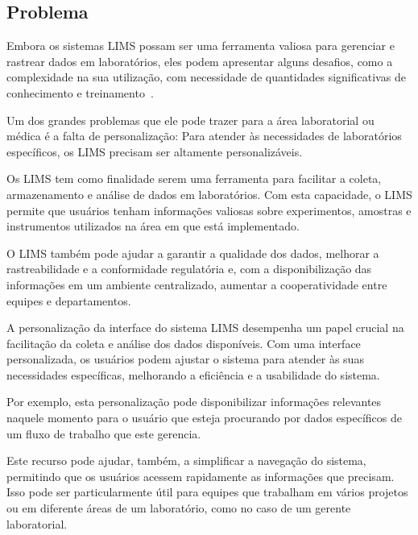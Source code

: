 \subsection{Problema}

Embora os sistemas LIMS possam ser uma ferramenta valiosa para gerenciar e rastrear dados em laboratórios, eles podem apresentar alguns desafios, como a complexidade na sua utilização, com necessidade de quantidades significativas de conhecimento e treinamento~\cite{Avery2000ProductGuide.}.

Um dos grandes problemas que ele pode trazer para a área laboratorial ou médica é a falta de personalização: Para atender às necessidades de laboratórios específicos, os LIMS precisam ser altamente personalizáveis.

Os LIMS tem como finalidade serem uma ferramenta para facilitar a coleta, armazenamento e análise de dados em laboratórios. Com esta capacidade, o LIMS permite que usuários tenham informações valiosas sobre experimentos, amostras e instrumentos utilizados na área em que está implementado.

O LIMS também pode ajudar a garantir a qualidade dos dados, melhorar a rastreabilidade e a conformidade regulatória e, com a disponibilização das informações em um ambiente centralizado, aumentar a cooperatividade entre equipes e departamentos.

A personalização da interface do sistema LIMS desempenha um papel crucial na facilitação da coleta e análise dos dados disponíveis. Com uma interface personalizada, os usuários podem ajustar o sistema para atender às suas necessidades específicas, melhorando a eficiência e a usabilidade do sistema.

Por exemplo, esta personalização pode disponibilizar informações relevantes naquele momento para o usuário que esteja procurando por dados específicos de um fluxo de trabalho que este gerencia.

Este recurso pode ajudar, também, a simplificar a navegação do sistema, permitindo que os usuários acessem rapidamente as informações que precisam. Isso pode ser particularmente útil para equipes que trabalham em vários projetos ou em diferente áreas de um laboratório, como no caso de um gerente laboratorial.